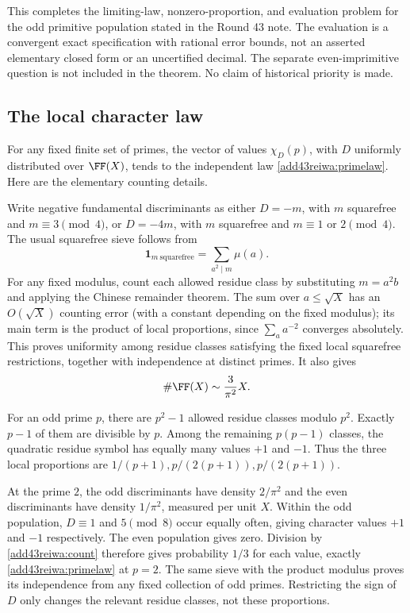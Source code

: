 \documentclass[11pt,a4paper]{article}
\numberwithin{equation}{section}
\theoremstyle{definition}
\theoremstyle{remark}
\begin{document}
This completes the limiting-law, nonzero-proportion, and evaluation
problem for the odd primitive population stated in the Round 43 note.
The evaluation is a convergent exact specification with rational
error bounds, not an asserted elementary closed form or an uncertified
decimal. The separate even-imprimitive question is not included in
the theorem. No claim of historical priority is made.

\subsection{The local character law}
For any fixed finite set of primes, the vector of values $\chi_D(p)$,
with $D$ uniformly distributed over $\FF(X)$, tends to the independent
law \eqref{add43reiwa:primelaw}. Here are the elementary counting details.

Write negative fundamental discriminants as either $D=-m$, with $m$
squarefree and $m\equiv3\pmod4$, or $D=-4m$, with $m$ squarefree
and $m\equiv1$ or $2\pmod4$. The usual squarefree sieve follows from
\[
 \mathbf1_{m\ \mathrm{squarefree}}=\sum_{a^2\mid m}\mu(a).
\]
For any fixed modulus, count each allowed residue class by substituting
$m=a^2b$ and applying the Chinese remainder theorem. The sum over
$a\le\sqrt X$ has an $O(\sqrt X)$ counting error (with a constant
depending on the fixed modulus); its main term is the product of
local proportions, since $\sum_a a^{-2}$ converges absolutely.
This proves uniformity among residue classes satisfying the fixed
local squarefree restrictions, together with independence at distinct
primes. It also gives
\begin{equation}\label{add43reiwa:count}
                    \#\FF(X)\sim\frac{3}{\pi^2}X.
\end{equation}

For an odd prime $p$, there are $p^2-1$ allowed residue classes
modulo $p^2$. Exactly $p-1$ of them are divisible by $p$. Among the
remaining $p(p-1)$ classes, the quadratic residue symbol has equally
many values $+1$ and $-1$. Thus the three local proportions are
$1/(p+1),p/(2(p+1)),p/(2(p+1))$.

At the prime $2$, the odd discriminants have density $2/\pi^2$ and
the even discriminants have density $1/\pi^2$, measured per unit $X$.
Within the odd population, $D\equiv1$ and $5\pmod8$ occur equally
often, giving character values $+1$ and $-1$ respectively. The even
population gives zero. Division by \eqref{add43reiwa:count} therefore gives
probability $1/3$ for each value, exactly \eqref{add43reiwa:primelaw} at $p=2$.
The same sieve with the product modulus proves its independence
from any fixed collection of odd primes. Restricting the sign of $D$
only changes the relevant residue classes, not these proportions.
\end{document}
